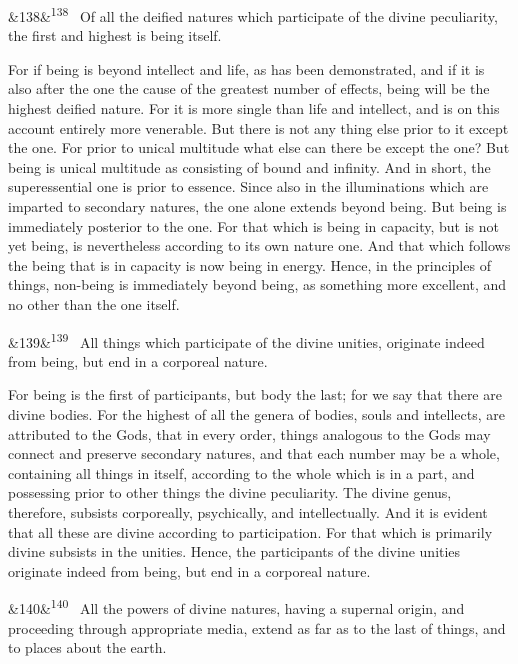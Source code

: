 \documentclass[12pt]{article}
\newcommand{\para}[1][]{\par\noindent\ifx&#1&\else\textsuperscript{\footnotesize #1}~\fi}
\begin{document}
\para[138] Of all the deified natures which participate of the divine peculiarity, the first and highest is being itself.

For if being is beyond intellect and life, as has been demonstrated, and if it is also after the one the cause of the greatest number of effects, being will be the highest deified nature. For it is more single than life and intellect, and is on this account entirely more venerable. But there is not any thing else prior to it except the one. For prior to unical multitude what else can there be except the one? But being is unical multitude as consisting of bound and infinity. And in short, the superessential one is prior to essence. Since also in the illuminations which are imparted to secondary natures, the one alone extends beyond being. But being is immediately posterior to the one. For that which is being in capacity, but is not yet being, is nevertheless according to its own nature one. And that which follows the being that is in capacity is now being in energy. Hence, in the principles of things, non-being is immediately beyond being, as something more excellent, and no other than the one itself.

\para[139] All things which participate of the divine unities, originate indeed from being, but end in a corporeal nature.

For being is the first of participants, but body the last; for we say that there are divine bodies. For the highest of all the genera of bodies, souls and intellects, are attributed to the Gods, that in every order, things analogous to the Gods may connect and preserve secondary natures, and that each number may be a whole, containing all things in itself, according to the whole which is in a part, and possessing prior to other things the divine peculiarity. The divine genus, therefore, subsists corporeally, psychically, and intellectually. And it is evident that all these are divine according to participation. For that which is primarily divine subsists in the unities. Hence, the participants of the divine unities originate indeed from being, but end in a corporeal nature.

\para[140] All the powers of divine natures, having a supernal origin, and proceeding through appropriate media, extend as far as to the last of things, and to places about the earth.
\end{document}
